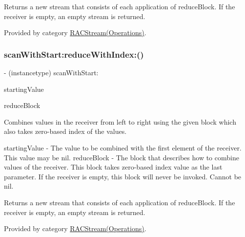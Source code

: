 Returns a new stream that consists of each application of {\ttfamily reduce\+Block}. If the receiver is empty, an empty stream is returned. 

Provided by category \mbox{\hyperlink{category_r_a_c_stream_07_operations_08_aa86990e9bc4cbc3dff2815f56b907b41}{R\+A\+C\+Stream(\+Operations)}}.

\mbox{\label{interface_r_a_c_stream_a69cedeb6e96a6d4154f2256fdcbe27b1}} 
\subsubsection{\texorpdfstring{scan\+With\+Start\+:reduce\+With\+Index\+:()}{scanWithStart:reduceWithIndex:()}\hspace{0.1cm}{\footnotesize\ttfamily [1/3]}}
{\footnotesize\ttfamily -\/ (instancetype) scan\+With\+Start\+: \begin{DoxyParamCaption}\item[{(id)}]{starting\+Value }\item[{reduceWithIndex:(id($^\wedge$)(id running, id next, N\+S\+U\+Integer index))}]{reduce\+Block }\end{DoxyParamCaption}}

Combines values in the receiver from left to right using the given block which also takes zero-\/based index of the values.

starting\+Value -\/ The value to be combined with the first element of the receiver. This value may be {\ttfamily nil}. reduce\+Block -\/ The block that describes how to combine values of the receiver. This block takes zero-\/based index value as the last parameter. If the receiver is empty, this block will never be invoked. Cannot be nil.

Returns a new stream that consists of each application of {\ttfamily reduce\+Block}. If the receiver is empty, an empty stream is returned. 

Provided by category \mbox{\hyperlink{category_r_a_c_stream_07_operations_08_a69cedeb6e96a6d4154f2256fdcbe27b1}{R\+A\+C\+Stream(\+Operations)}}.

\mbox{\label{interface_r_a_c_stream_a69cedeb6e96a6d4154f2256fdcbe27b1}} 
